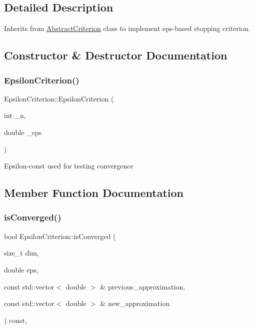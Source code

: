 \subsection{Detailed Description}
Inherits from \hyperlink{class_abstract_criterion}{Abstract\+Criterion} class to implement eps-\/based stopping criterion. 

\subsection{Constructor \& Destructor Documentation}
\mbox{\label{class_epsilon_criterion_a0f84f83305ad598ca5d5458de648fbc3}} 
\subsubsection{\texorpdfstring{Epsilon\+Criterion()}{EpsilonCriterion()}}
{\footnotesize\ttfamily Epsilon\+Criterion\+::\+Epsilon\+Criterion (\begin{DoxyParamCaption}\item[{int}]{\+\_\+n,  }\item[{double}]{\+\_\+eps }\end{DoxyParamCaption})}

Epsilon-\/const used for testing convergence 

\subsection{Member Function Documentation}
\mbox{\label{class_epsilon_criterion_a3e548b8cc84db57deb00708b1c361604}} 
\subsubsection{\texorpdfstring{is\+Converged()}{isConverged()}}
{\footnotesize\ttfamily bool Epsilon\+Criterion\+::is\+Converged (\begin{DoxyParamCaption}\item[{size\+\_\+t}]{dim,  }\item[{double}]{eps,  }\item[{const std\+::vector$<$ double $>$ \&}]{previous\+\_\+approximation,  }\item[{const std\+::vector$<$ double $>$ \&}]{new\+\_\+approximation }\end{DoxyParamCaption}) const\hspace{0.3cm}{\ttfamily [override]}, {\ttfamily [virtual]}}

